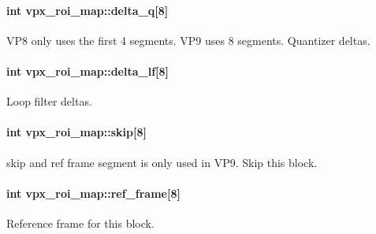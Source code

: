 \paragraph[{\texorpdfstring{delta\+\_\+q}{delta_q}}]{\setlength{\rightskip}{0pt plus 5cm}int vpx\+\_\+roi\+\_\+map\+::delta\+\_\+q\mbox{[}8\mbox{]}}\hypertarget{structvpx__roi__map_aa41b78c77cb7f2f24ad5b336c40cdf3c}{}\label{structvpx__roi__map_aa41b78c77cb7f2f24ad5b336c40cdf3c}
V\+P8 only uses the first 4 segments. V\+P9 uses 8 segments. Quantizer deltas. 
\paragraph[{\texorpdfstring{delta\+\_\+lf}{delta_lf}}]{\setlength{\rightskip}{0pt plus 5cm}int vpx\+\_\+roi\+\_\+map\+::delta\+\_\+lf\mbox{[}8\mbox{]}}\hypertarget{structvpx__roi__map_aca3e926d9612ac6530092f7cfb0dc34c}{}\label{structvpx__roi__map_aca3e926d9612ac6530092f7cfb0dc34c}
Loop filter deltas. 
\paragraph[{\texorpdfstring{skip}{skip}}]{\setlength{\rightskip}{0pt plus 5cm}int vpx\+\_\+roi\+\_\+map\+::skip\mbox{[}8\mbox{]}}\hypertarget{structvpx__roi__map_a2547af0f5b4f9c42cb5fb902803245d9}{}\label{structvpx__roi__map_a2547af0f5b4f9c42cb5fb902803245d9}
skip and ref frame segment is only used in V\+P9. Skip this block. 
\paragraph[{\texorpdfstring{ref\+\_\+frame}{ref_frame}}]{\setlength{\rightskip}{0pt plus 5cm}int vpx\+\_\+roi\+\_\+map\+::ref\+\_\+frame\mbox{[}8\mbox{]}}\hypertarget{structvpx__roi__map_a570cce9ea40de31cce7a070e11cb5678}{}\label{structvpx__roi__map_a570cce9ea40de31cce7a070e11cb5678}
Reference frame for this block. 
